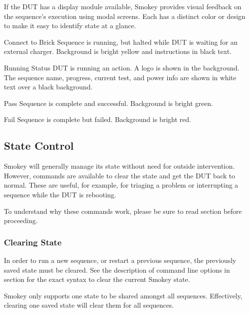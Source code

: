 If the DUT has a display module available, Smokey provides visual feedback on
the sequence's execution using modal screens.  Each has a distinct color or
design to make it easy to identify state at a glance.

\begin{Descriptive}

	\item[Connect to Brick] Sequence is running, but halted while DUT is
	waiting for an external charger.  Background is bright yellow and
	instructions in black text.

	\item[Running Status] DUT is running an action.  A logo is shown in the
	background.  The sequence name, progress, current test, and power info
	are shown in white text over a black background.

	\item[Pass] Sequence is complete and successful.  Background is bright
	green.

	\item[Fail] Sequence is complete but failed.  Background is bright red.

\end{Descriptive}

\subsection{State Control}

Smokey will generally manage its state without need for outside intervention.
However, commands are available to clear the state and get the DUT back to
normal.  These are useful, for example, for triaging a problem or interrupting
a sequence while the DUT is rebooting.

To understand why these commands work, please be sure to read section
 before proceeding.

\subsubsection{Clearing State}

In order to run a new sequence, or restart a previous sequence, the previously
saved state must be cleared.  See the description of command line options in
section  for the exact syntax to clear the current
Smokey state.

Smokey only supports one state to be shared amongst all sequences.
Effectively, clearing one saved state will clear them for all sequences.

